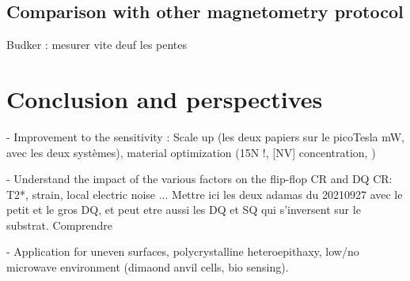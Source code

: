\documentclass[a4paper,11pt]{report}
\begin{document}
\subsection{Comparison with other magnetometry protocol}
Budker : mesurer vite deuf les pentes
\section{Conclusion and perspectives}
- Improvement to the sensitivity : Scale up (les deux papiers sur le picoTesla mW, avec les deux systèmes), material optimization (15N !, [NV] concentration, )

- Understand the impact of the various factors on the flip-flop CR and DQ CR: T2*, strain, local electric noise ... Mettre ici les deux adamas du 20210927 avec le petit et le gros DQ, et peut etre aussi les DQ et SQ qui s'inversent sur le substrat. Comprendre 

- Application for uneven surfaces, polycrystalline heteroepithaxy, low/no microwave environment (dimaond anvil cells, bio sensing).

\printbibliography
\end{document}
